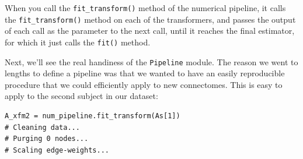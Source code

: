 When you call the \texttt{fit\_transform()} method of the numerical pipeline, it calls the \texttt{fit\_transform()} method on each of the transformers, and passes the output of each call as the parameter to the next call, until it reaches the final estimator, for which it just calls the \texttt{fit()} method. 

Next, we'll see the real handiness of the \texttt{Pipeline} module. The reason we went to lengths to define a pipeline was that we wanted to have an easily reproducible procedure that we could efficiently apply to new connectomes. This is easy to apply to the second subject in our dataset:

\begin{lstlisting}[style=python]
A_xfm2 = num_pipeline.fit_transform(As[1])
# Cleaning data...
# Purging 0 nodes...
# Scaling edge-weights...
\end{lstlisting}

\newpage